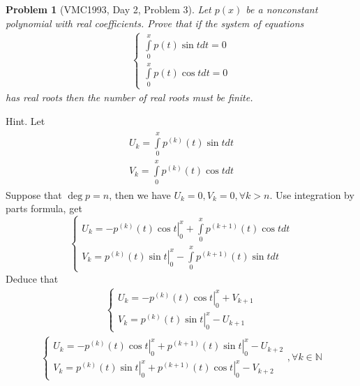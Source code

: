 \documentclass{article}
\newtheorem{problem}{Problem}
\begin{document}
\begin{problem}[VMC1993, Day 2, Problem 3]
	Let $p(x)$ be a nonconstant polynomial with real coefficients. Prove that if the system of equations
	\begin{align}
		\left\{ {\begin{array}{*{20}{c}}
				{\int\limits_0^x {p\left( t \right)\sin tdt = 0} }\\
				{\int\limits_0^x {p\left( t \right)\cos tdt = 0} }
		\end{array}} \right.
	\end{align}
	has real roots then the number of real roots must be finite.
\end{problem}
{\sf Hint.} Let 
\begin{align}
	\begin{array}{l}
		{U_k} = \int\limits_0^x {{p^{\left( k \right)}}\left( t \right)\sin t} dt\\
		{V_k} = \int\limits_0^x {{p^{\left( k \right)}}\left( t \right)\cos t} dt
	\end{array}
\end{align}
Suppose that $\deg p=n$, then we have ${U_k} = 0,{V_k} = 0,\forall k > n$. Use integration by parts formula, get
\begin{equation}
	\label{2.1}
	\left\{ \begin{array}{l}
		{U_k} = \left. { - {p^{\left( k \right)}}\left( t \right)\cos t} \right|_0^x + \int\limits_0^x {{p^{\left( {k + 1} \right)}}\left( t \right)\cos t} dt\\
		{V_k} = \left. {{p^{\left( k \right)}}\left( t \right)\sin t} \right|_0^x - \int\limits_0^x {{p^{\left( {k + 1} \right)}}\left( t \right)\sin t} dt
	\end{array} \right.
\end{equation}
Deduce that
\begin{align}
	\left\{ \begin{array}{l}
		{U_k} = \left. { - {p^{\left( k \right)}}\left( t \right)\cos t} \right|_0^x + {V_{k + 1}}\\
		{V_k} = \left. {{p^{\left( k \right)}}\left( t \right)\sin t} \right|_0^x - {U_{k + 1}}
	\end{array} \right.
\end{align}
\begin{align}
	\left\{ \begin{array}{l}
		{U_k} = \left. { - {p^{\left( k \right)}}\left( t \right)\cos t} \right|_0^x + \left. {{p^{\left( {k + 1} \right)}}\left( t \right)\sin t} \right|_0^x - {U_{k + 2}}\\
		{V_k} = \left. {{p^{\left( k \right)}}\left( t \right)\sin t} \right|_0^x + \left. {{p^{\left( {k + 1} \right)}}\left( t \right)\cos t} \right|_0^x - {V_{k + 2}}
	\end{array} \right.,\forall k \in \mathbb{N}
\end{align}
\end{document}
